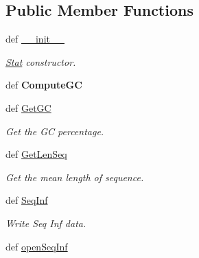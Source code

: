 \subsection*{\-Public \-Member \-Functions}
\begin{DoxyCompactItemize}
\item 
\hypertarget{classiRNA__pred_1_1Stat_1_1Stat_a326772f7e0d8702eb16834e70aa803c5}{
def \hyperlink{classiRNA__pred_1_1Stat_1_1Stat_a326772f7e0d8702eb16834e70aa803c5}{\-\_\-\-\_\-init\-\_\-\-\_\-}}
\label{classiRNA__pred_1_1Stat_1_1Stat_a326772f7e0d8702eb16834e70aa803c5}

\begin{DoxyCompactList}\small\item\em \hyperlink{classiRNA__pred_1_1Stat_1_1Stat}{\-Stat} constructor. \end{DoxyCompactList}\item 
\hypertarget{classiRNA__pred_1_1Stat_1_1Stat_a60f46af0b7a53da44d4b0f8df4818f5c}{
def {\bfseries \-Compute\-G\-C}}
\label{classiRNA__pred_1_1Stat_1_1Stat_a60f46af0b7a53da44d4b0f8df4818f5c}

\item 
def \hyperlink{classiRNA__pred_1_1Stat_1_1Stat_abe17a96a8c002d79765af314cd6eb7e7}{\-Get\-G\-C}
\begin{DoxyCompactList}\small\item\em \-Get the \-G\-C percentage. \end{DoxyCompactList}\item 
def \hyperlink{classiRNA__pred_1_1Stat_1_1Stat_a65aa8b73f36d17ffb5c9de897b6bbd34}{\-Get\-Len\-Seq}
\begin{DoxyCompactList}\small\item\em \-Get the mean length of sequence. \end{DoxyCompactList}\item 
\hypertarget{classiRNA__pred_1_1Stat_1_1Stat_aada3e0e9e2c4746f95bb15a108470232}{
def \hyperlink{classiRNA__pred_1_1Stat_1_1Stat_aada3e0e9e2c4746f95bb15a108470232}{\-Seq\-Inf}}
\label{classiRNA__pred_1_1Stat_1_1Stat_aada3e0e9e2c4746f95bb15a108470232}

\begin{DoxyCompactList}\small\item\em \-Write \-Seq \-Inf data. \end{DoxyCompactList}\item 
\hypertarget{classiRNA__pred_1_1Stat_1_1Stat_a9d89bd33206da0426191f60587386d13}{
def \hyperlink{classiRNA__pred_1_1Stat_1_1Stat_a9d89bd33206da0426191f60587386d13}{open\-Seq\-Inf}}
\label{classiRNA__pred_1_1Stat_1_1Stat_a9d89bd33206da0426191f60587386d13}


\end{DoxyCompactItemize}

